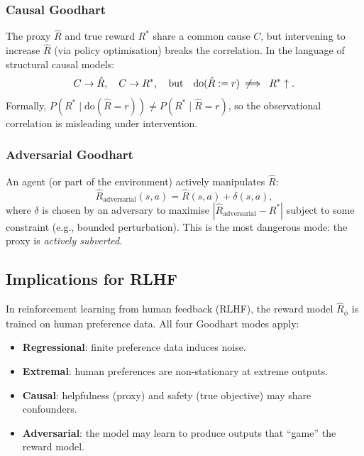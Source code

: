 \documentclass[11pt,a4paper]{article}
\theoremstyle{definition}
\begin{document}
\subsubsection{Causal Goodhart}

The proxy $\hat{R}$ and true reward $R^*$ share a common cause $C$, but
intervening to increase $\hat{R}$ (via policy optimisation) breaks the
correlation. In the language of structural causal models:
\begin{equation}
  C \to \hat{R}, \quad C \to R^*,
  \quad\text{but}\quad
  \mathrm{do}(\hat{R} := r) \;\not\!\!\implies\; R^* \uparrow.
\end{equation}
Formally, $P(R^* \mid \mathrm{do}(\hat{R} = r)) \neq P(R^* \mid \hat{R} = r)$,
so the observational correlation is misleading under intervention.

\subsubsection{Adversarial Goodhart}

An agent (or part of the environment) actively manipulates $\hat{R}$:
\begin{equation}
  \hat{R}_{\text{adversarial}}(s,a) = \hat{R}(s,a) + \delta(s,a),
\end{equation}
where $\delta$ is chosen by an adversary to maximise
$|\hat{R}_{\text{adversarial}} - R^*|$ subject to some constraint
(e.g., bounded perturbation). This is the most dangerous mode: the proxy
is \emph{actively subverted}.

\subsection{Implications for RLHF}

In reinforcement learning from human feedback (RLHF), the reward model
$\hat{R}_\phi$ is trained on human preference data.
All four Goodhart modes apply:
\begin{itemize}
  \item \textbf{Regressional}: finite preference data induces noise.
  \item \textbf{Extremal}: human preferences are non-stationary at extreme outputs.
  \item \textbf{Causal}: helpfulness (proxy) and safety (true objective)
    may share confounders.
  \item \textbf{Adversarial}: the model may learn to produce outputs that
    ``game'' the reward model.
\end{itemize}
\end{document}
